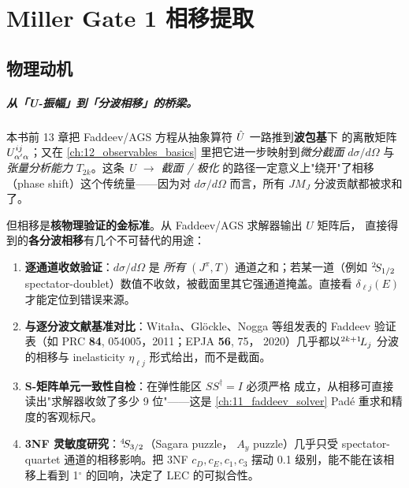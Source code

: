 
\chapter{Miller Gate 1 相移提取}
\label{ch:14_miller_gate1}

\section{物理动机}
\label{sec:ch14-motivation}

\paragraph{从「U-振幅」到「分波相移」的桥梁。}
本书前 13 章把 Faddeev/AGS 方程从抽象算符 \(\hat{U}\) 一路推到\textbf{波包基}下
的离散矩阵 \(U_{\alpha'\alpha}^{ij}\)；又在 \cref{ch:12_observables_basics}
里把它进一步映射到\emph{微分截面} \(d\sigma/d\Omega\) 与\emph{张量分析能力}
\(T_{2k}\)。这条 \emph{U \(\to\) 截面 / 极化} 的路径一定意义上"绕开"了相移
（phase shift）这个传统量——因为对 \(d\sigma/d\Omega\) 而言，所有 \(JM_J\)
分波贡献都被求和了。

但相移是\textbf{核物理验证的金标准}。从 Faddeev/AGS 求解器输出 \(U\) 矩阵后，
直接得到的\textbf{各分波相移}有几个不可替代的用途：
\begin{enumerate}
  \item \textbf{逐通道收敛验证}：\(d\sigma/d\Omega\) 是 \emph{所有}
        \((J^\pi, T)\) 通道之和；若某一道（例如 \({}^{2}\!S_{1/2}\)
        spectator-doublet）数值不收敛，被截面里其它强通道掩盖。直接看
        \(\delta_{\ell j}(E)\) 才能定位到错误来源。
  \item \textbf{与逐分波文献基准对比}：Witała、Glöckle、Nogga 等组发表的
        Faddeev 验证表（如 PRC \textbf{84}, 054005，2011；EPJA \textbf{56}, 75，
        2020）几乎都以\({}^{2k+1}\!L_{j}\) 分波的相移与 inelasticity
        \(\eta_{\ell j}\) 形式给出，而不是截面。
  \item \textbf{S-矩阵单元一致性自检}：在弹性能区 \(SS^\dagger = I\) 必须严格
        成立，从相移可直接读出"求解器收敛了多少 9 位"——这是
        \cref{ch:11_faddeev_solver} Padé 重求和精度的客观标尺。
  \item \textbf{3NF 灵敏度研究}：\({}^{4}\!S_{3/2}\)（Sagara puzzle，
        \(A_y\) puzzle）几乎只受 spectator-quartet 通道的相移影响。把 3NF
        \(c_D, c_E, c_1, c_3\) 摆动 0.1 级别，能不能在该相移上看到 1\(^\circ\)
        的回响，决定了 LEC 的可拟合性。
\end{enumerate}


